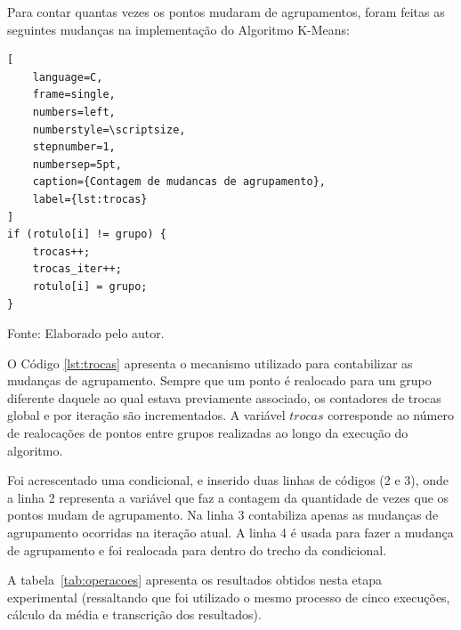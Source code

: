 \documentclass[10pt,a4paper,twocolumn]{article}
\begin{document}
Para contar quantas vezes os pontos mudaram de agrupamentos, foram feitas as seguintes mudanças na implementação do Algoritmo K-Means: 

\begin{lstlisting}[
    language=C,
    frame=single,
    numbers=left,
    numberstyle=\scriptsize,
    stepnumber=1,
    numbersep=5pt,
    caption={Contagem de mudancas de agrupamento},
    label={lst:trocas}
]
if (rotulo[i] != grupo) {
    trocas++;
    trocas_iter++;
    rotulo[i] = grupo;
}
\end{lstlisting}

\begin{center}
{\small Fonte: Elaborado pelo autor.}
\end{center}

O Código \ref{lst:trocas} apresenta o mecanismo utilizado para contabilizar as mudanças de agrupamento. Sempre que um ponto é realocado para um grupo diferente daquele ao qual estava previamente associado, os contadores de trocas global e por iteração são incrementados. A variável $trocas$ corresponde ao número de realocações de pontos entre grupos realizadas ao longo da execução do algoritmo.

Foi acrescentado uma condicional, e inserido duas linhas de códigos (2 e 3), onde a linha 2 representa a variável que faz a contagem da quantidade de vezes que os pontos mudam de agrupamento. Na linha 3 contabiliza apenas as mudanças de agrupamento ocorridas na iteração atual. A linha 4 é usada para fazer a mudança de agrupamento e foi realocada para dentro do trecho da condicional. 

A tabela~\ref{tab:operacoes} apresenta os resultados obtidos nesta etapa experimental (ressaltando que foi utilizado o mesmo processo de cinco execuções, cálculo da média e transcrição dos resultados). 
\end{document}
